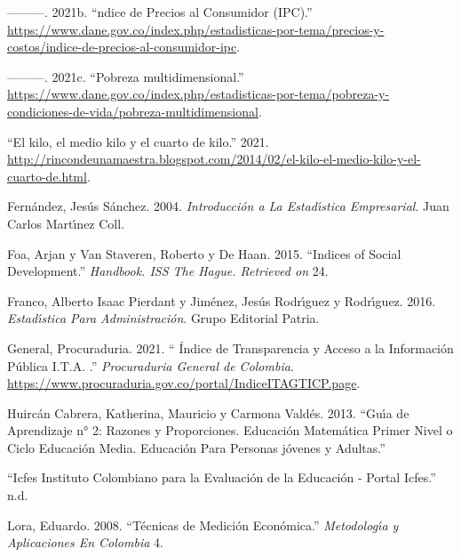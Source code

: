 \documentclass[
  11pt,
]{book}
\newlength{\cslhangindent}
\newlength{\cslentryspacingunit} %
\newenvironment{CSLReferences}[2] %
 {%
  \setlength{\parindent}{0pt}
  \ifodd #1
  \let\oldpar\par
  \def\par{\hangindent=\cslhangindent\oldpar}
  \fi
  \setlength{\parskip}{#2\cslentryspacingunit}
 }%
 {}
\begin{document}
\begin{CSLReferences}{1}{0}
\leavevmode{}%
---------. 2021b. {``{{\ifmmode{}\fi}ndice de Precios al Consumidor (IPC)}.''} \url{https://www.dane.gov.co/index.php/estadisticas-por-tema/precios-y-costos/indice-de-precios-al-consumidor-ipc}.

\leavevmode{}%
---------. 2021c. {``{Pobreza multidimensional}.''} \url{https://www.dane.gov.co/index.php/estadisticas-por-tema/pobreza-y-condiciones-de-vida/pobreza-multidimensional}.

\leavevmode{}%
{``{El kilo, el medio kilo y el cuarto de kilo}.''} 2021. \url{http://rincondeunamaestra.blogspot.com/2014/02/el-kilo-el-medio-kilo-y-el-cuarto-de.html}.

\leavevmode{}%
Fernández, Jesús Sánchez. 2004. \emph{Introducci{ó}n a La Estad{ı́}stica Empresarial}. Juan Carlos Mart{ı́}nez Coll.

\leavevmode{}%
Foa, Arjan y Van Staveren, Roberto y De Haan. 2015. {``Indices of Social Development.''} \emph{Handbook. ISS The Hague. Retrieved on} 24.

\leavevmode{}%
Franco, Alberto Isaac Pierdant y Jiménez, Jesús Rodrı́guez y Rodrı́guez. 2016. \emph{Estad{ı́}stica Para Administraci{ó}n}. Grupo Editorial Patria.

\leavevmode{}%
General, Procuraduria. 2021. {``{ Índice de Transparencia y Acceso a la Información Pública I.T.A. }.''} \emph{Procuraduria General de Colombia}. \url{https://www.procuraduria.gov.co/portal/IndiceITAGTICP.page}.

\leavevmode{}%
Huircán Cabrera, Katherina, Mauricio y Carmona Valdés. 2013. {``Gu{ı́}a de Aprendizaje n° 2: Razones y Proporciones. Educaci{ó}n Matem{á}tica Primer Nivel o Ciclo Educaci{ó}n Media. Educaci{ó}n Para Personas j{ó}venes y Adultas.''}

\leavevmode{}%
{``{Icfes Instituto Colombiano para la Evaluaci{ó}n de la Educaci{ó}}n - Portal Icfes.''} n.d.

\leavevmode{}%
Lora, Eduardo. 2008. {``T{é}cnicas de Medici{ó}n Econ{ó}mica.''} \emph{Metodolog{ı́}a y Aplicaciones En Colombia} 4.


\end{CSLReferences}
\end{document}
